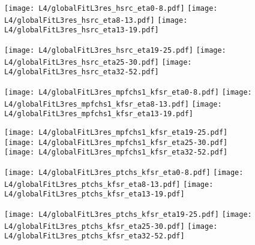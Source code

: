 \documentclass[landscape,10pt]{beamer} %
\begin{document}
{\newpage

\begin{figure}[p]
\centering
  \texttt{[image: L4/globalFitL3res\_hsrc\_eta0-8.pdf]}
  \texttt{[image: L4/globalFitL3res\_hsrc\_eta8-13.pdf]}
  \texttt{[image: L4/globalFitL3res\_hsrc\_eta13-19.pdf]}
\end{figure}
\begin{figure}[p]
\centering
  \texttt{[image: L4/globalFitL3res\_hsrc\_eta19-25.pdf]}
  \texttt{[image: L4/globalFitL3res\_hsrc\_eta25-30.pdf]}
  \texttt{[image: L4/globalFitL3res\_hsrc\_eta32-52.pdf]}
\end{figure}

\newpage

\begin{figure}[p]
\centering
  \texttt{[image: L4/globalFitL3res\_mpfchs1\_kfsr\_eta0-8.pdf]}
  \texttt{[image: L4/globalFitL3res\_mpfchs1\_kfsr\_eta8-13.pdf]}
  \texttt{[image: L4/globalFitL3res\_mpfchs1\_kfsr\_eta13-19.pdf]}
\end{figure}
\begin{figure}[p]
\centering
  \texttt{[image: L4/globalFitL3res\_mpfchs1\_kfsr\_eta19-25.pdf]}
  \texttt{[image: L4/globalFitL3res\_mpfchs1\_kfsr\_eta25-30.pdf]}
  \texttt{[image: L4/globalFitL3res\_mpfchs1\_kfsr\_eta32-52.pdf]}
\end{figure}

\newpage

\begin{figure}[p]
\centering
  \texttt{[image: L4/globalFitL3res\_ptchs\_kfsr\_eta0-8.pdf]}
  \texttt{[image: L4/globalFitL3res\_ptchs\_kfsr\_eta8-13.pdf]}
  \texttt{[image: L4/globalFitL3res\_ptchs\_kfsr\_eta13-19.pdf]}
\end{figure}
\begin{figure}[p]
\centering
  \texttt{[image: L4/globalFitL3res\_ptchs\_kfsr\_eta19-25.pdf]}
  \texttt{[image: L4/globalFitL3res\_ptchs\_kfsr\_eta25-30.pdf]}
  \texttt{[image: L4/globalFitL3res\_ptchs\_kfsr\_eta32-52.pdf]}
\end{figure}

}
\end{document}
